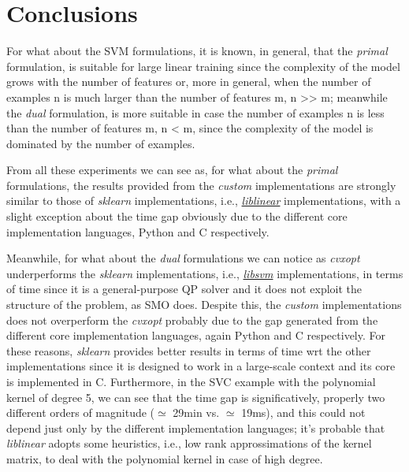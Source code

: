 \section{Conclusions}

For what about the SVM formulations, it is known, in general, that the \emph{primal} formulation, is suitable for large linear training since the complexity of the model grows with the number of features or, more in general, when the number of examples n is much larger than 
the number of features m, n >> m; meanwhile the \emph{dual} formulation, is more suitable in case the number of examples n is less than the number of features m, n < m, since the complexity of the model is dominated by the number of examples.

From all these experiments we can see as, for what about the \emph{primal} formulations, the results provided from the \emph{custom} implementations are strongly similar to those of \emph{sklearn} implementations, i.e., \href{https://www.csie.ntu.edu.tw/~cjlin/liblinear}{\emph{liblinear}} implementations, with a slight exception about the time gap obviously due to the different core implementation languages, Python and C respectively.

Meanwhile, for what about the \emph{dual} formulations we can notice as \emph{cvxopt} underperforms the \emph{sklearn} implementations, i.e., \href{https://www.csie.ntu.edu.tw/~cjlin/libsvm}{\emph{libsvm}} implementations, in terms of time since it is a general-purpose QP solver and it does not exploit the structure of the problem, as SMO does.
Despite this, the \emph{custom} implementations does not overperform the \emph{cvxopt} probably due to the gap generated from the different core implementation languages, again Python and C respectively.
For these reasons, \emph{sklearn} provides better results in terms of time wrt the other implementations since it is designed to work in a large-scale context and its core is implemented in C.
Furthermore, in the SVC example with the polynomial kernel of degree 5, we can see that the time gap is significatively, properly two different orders of magnitude ($\simeq$ 29min vs. $\simeq$ 19ms), and this could not depend just only by the different implementation languages; it's probable that \emph{liblinear} adopts some heuristics, i.e., low rank approssimations of the kernel matrix, to deal with the polynomial kernel in case of high degree.

